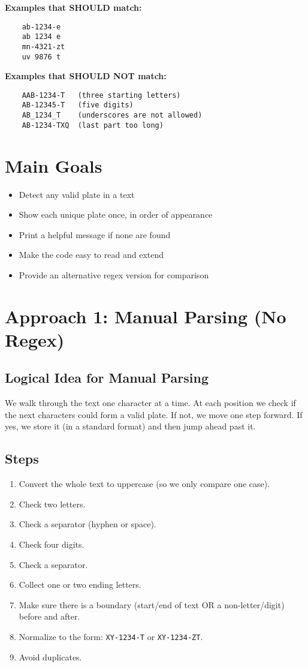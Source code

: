 \documentclass[12pt,a4paper]{article}
\begin{document}
\noindent \textbf{Examples that SHOULD match:}
\begin{verbatim}
    ab-1234-e
    ab 1234 e
    mn-4321-zt
    uv 9876 t
\end{verbatim}

\noindent \textbf{Examples that SHOULD NOT match:}
\begin{verbatim}
    AAB-1234-T   (three starting letters)
    AB-12345-T   (five digits)
    AB_1234_T    (underscores are not allowed)
    AB-1234-TXQ  (last part too long)
\end{verbatim}

\section{Main Goals}
\begin{itemize}
    \item Detect any valid plate in a text
    \item Show each unique plate once, in order of appearance
    \item Print a helpful message if none are found
    \item Make the code easy to read and extend
    \item Provide an alternative regex version for comparison
\end{itemize}

\section{Approach 1: Manual Parsing (No Regex)}
\subsection{Logical Idea for Manual Parsing}
We walk through the text one character at a time. At each position we check if the next characters could form a valid plate. If not, we move one step forward. If yes, we store it (in a standard format) and then jump ahead past it.

\subsection{Steps}
\begin{enumerate}
    \item Convert the whole text to uppercase (so we only compare one case).
    \item Check two letters.
    \item Check a separator (hyphen or space).
    \item Check four digits.
    \item Check a separator.
    \item Collect one or two ending letters.
    \item Make sure there is a boundary (start/end of text OR a non-letter/digit) before and after.
    \item Normalize to the form: \texttt{XY-1234-T} or \texttt{XY-1234-ZT}.
    \item Avoid duplicates.
\end{enumerate}
\end{document}
